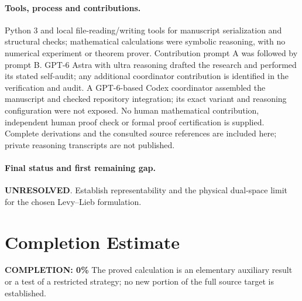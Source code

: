 \documentclass[11pt]{article}
\begin{document}
\paragraph{Tools, process and contributions.}
Python 3 and local file-reading/writing tools for manuscript serialization and structural checks; mathematical calculations were symbolic reasoning, with no numerical experiment or theorem prover. Contribution prompt A was followed by prompt B. GPT-6 Astra with ultra reasoning drafted the research and performed its stated self-audit; any additional coordinator contribution is identified in the verification and audit. A GPT-6-based Codex coordinator assembled the manuscript and checked repository integration; its exact variant and reasoning configuration were not exposed. No human mathematical contribution, independent human proof check or formal proof certification is supplied. Complete derivations and the consulted source references are included here; private reasoning transcripts are not published.

\paragraph{Final status and first remaining gap.}
\textbf{UNRESOLVED}. Establish representability and the physical dual-space limit for the chosen Levy--Lieb formulation.

\section{Completion Estimate}
\noindent\textbf{COMPLETION: 0\%}
The proved calculation is an elementary auxiliary result or a test of a restricted strategy; no new portion of the full source target is established.
\end{document}
